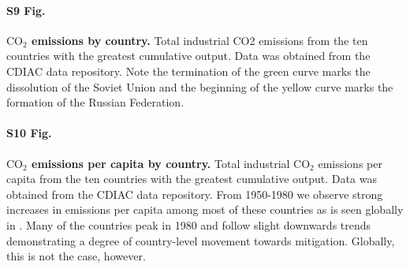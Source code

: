 \documentclass[10pt,letterpaper]{article}
\begin{document}
\paragraph*{S9 Fig.}
\label{S9_fig}
\textbf{$\text{CO}_2$ emissions by country.} Total industrial CO2 emissions from the ten countries with the greatest cumulative output. Data was obtained from the CDIAC data repository\cite{boden17}. Note the termination of the green curve marks the dissolution of the Soviet Union and the beginning of the yellow curve marks the formation of the Russian Federation.

\paragraph*{S10 Fig.}
\label{S10_fig}
\textbf{$\text{CO}_2$ emissions per capita by country.} Total industrial  $\text{CO}_2$ emissions per capita from the ten countries with the greatest cumulative output. Data was obtained from the CDIAC data repository\cite{boden17}. From 1950-1980 we observe strong increases in emissions per capita among most of these countries as is seen globally in . Many of the countries peak in 1980 and follow slight downwards trends demonstrating a degree of country-level movement towards mitigation. Globally, this is not the case, however.





\nolinenumbers

%
%
% 



\end{document}
